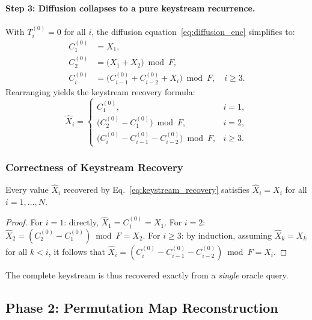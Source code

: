 \paragraph{Step 3: Diffusion collapses to a pure keystream recurrence.}
With $T^{(0)}_i = 0$ for all $i$, the diffusion equation~\eqref{eq:diffusion_enc} simplifies to:
\begin{align}
    C^{(0)}_1 &= X_1, \\
    C^{(0)}_2 &= \bigl(X_1 + X_2\bigr) \bmod F, \\
    C^{(0)}_i &= \bigl(C^{(0)}_{i-1} + C^{(0)}_{i-2} + X_i\bigr) \bmod F, \quad i \geq 3.
\end{align}
Rearranging yields the keystream recovery formula:
\begin{equation}
\boxed{
\hat{X}_i =
\begin{cases}
C^{(0)}_1, & i = 1,\\[4pt]
\bigl(C^{(0)}_2 - C^{(0)}_1\bigr) \bmod F, & i = 2,\\[4pt]
\bigl(C^{(0)}_i - C^{(0)}_{i-1} - C^{(0)}_{i-2}\bigr) \bmod F, & i \geq 3.
\end{cases}
}
\label{eq:keystream_recovery}
\end{equation}

\subsubsection{Correctness of Keystream Recovery}

\begin{proposition}
Every value $\hat{X}_i$ recovered by Eq.~\eqref{eq:keystream_recovery} satisfies $\hat{X}_i = X_i$ for all $i = 1, \ldots, N$.
\end{proposition}

\begin{proof}
For $i = 1$: directly, $\hat{X}_1 = C^{(0)}_1 = X_1$.
For $i = 2$: $\hat{X}_2 = (C^{(0)}_2 - C^{(0)}_1) \bmod F = X_2$.
For $i \geq 3$: by induction, assuming $\hat{X}_k = X_k$ for all $k < i$, it follows that
$\hat{X}_i = (C^{(0)}_i - C^{(0)}_{i-1} - C^{(0)}_{i-2}) \bmod F = X_i$.
\end{proof}

The complete keystream is thus recovered exactly from a \emph{single} oracle query.

\subsection{Phase 2: Permutation Map Reconstruction}

